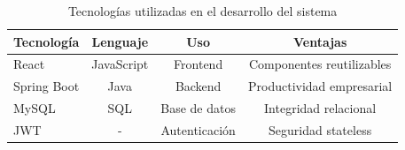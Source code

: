 \begin{table}[htbp]
\centering
\caption{Tecnologías utilizadas en el desarrollo del sistema}
\label{tab:frameworks}
\small
\begin{tabular}{lccc}
\toprule
\textbf{Tecnología} & \textbf{Lenguaje} & \textbf{Uso} & \textbf{Ventajas} \\
\midrule
React & JavaScript & Frontend & Componentes reutilizables \\
Spring Boot & Java & Backend & Productividad empresarial \\
MySQL & SQL & Base de datos & Integridad relacional \\
JWT & - & Autenticación & Seguridad stateless \\
\bottomrule
\end{tabular}
\end{table}